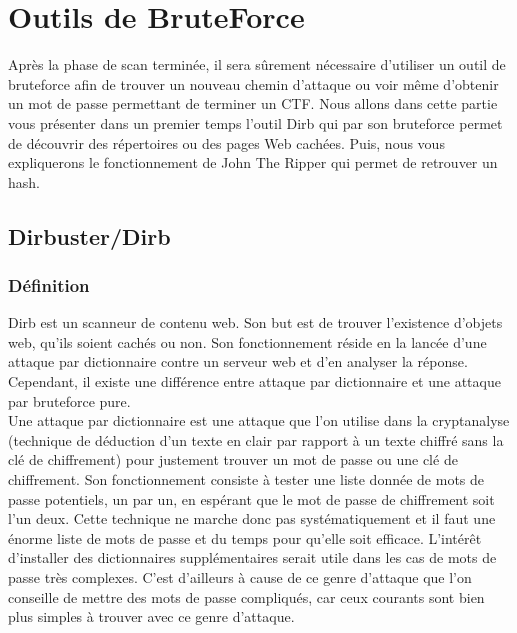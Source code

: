 \chapter{Outils de BruteForce}
\label{chap:BDD}

Après la phase de scan terminée, il sera sûrement nécessaire d'utiliser un outil de bruteforce afin de trouver un nouveau chemin d'attaque ou voir même d'obtenir un mot de passe permettant de terminer un CTF. Nous allons dans cette partie vous présenter dans un premier temps l'outil Dirb qui par son bruteforce permet de découvrir des répertoires ou des pages Web cachées. Puis, nous vous expliquerons le fonctionnement de John The Ripper qui permet de retrouver un hash.


\section{Dirbuster/Dirb}
\subsection{Définition}
Dirb est un scanneur de contenu web. Son but est de trouver l’existence d’objets web, qu’ils soient cachés ou non.
Son fonctionnement réside en la lancée d’une attaque par dictionnaire contre un serveur web et d’en analyser la réponse. \\
Cependant, il existe une différence entre attaque par dictionnaire et une attaque par bruteforce pure.\\
Une attaque par dictionnaire est une attaque que l’on utilise dans la cryptanalyse (technique de déduction d’un texte en clair par rapport à un texte chiffré sans la clé de chiffrement) pour justement trouver un mot de passe ou une clé de chiffrement. 
Son fonctionnement consiste à tester une liste donnée de mots de passe potentiels, un par un, en espérant que le mot de passe de chiffrement soit l’un deux. 
Cette technique ne marche donc pas systématiquement et il faut une énorme liste de mots de passe et du temps pour qu’elle soit efficace. L'intérêt d'installer des dictionnaires supplémentaires serait utile dans les cas de mots de passe très complexes.
C’est d’ailleurs à cause de ce genre d’attaque que l’on conseille de mettre des mots de passe compliqués, car ceux courants sont bien plus simples à trouver avec ce genre d’attaque. 
